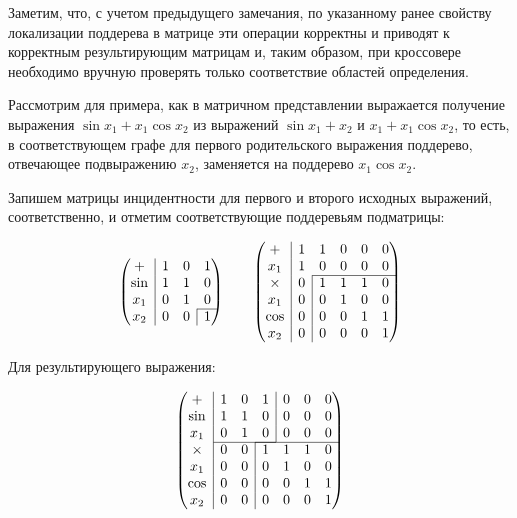 \documentclass[12pt,a4paper]{amsart}
\begin{document}
Заметим, что, с учетом предыдущего замечания, по указанному ранее свойству локализации поддерева в матрице эти
операции корректны и приводят к корректным результирующим матрицам и, таким образом, при кроссовере необходимо
вручную проверять только соответствие областей определения.

Рассмотрим для примера, как в матричном представлении выражается получение выражения $ \sin x_1 + x_1 \cos x_2 $ из
выражений $ \sin x_1 + x_2 $ и $ x_1 + x_1 \cos x_2 $, то есть, в соответствующем графе для первого родительского
выражения поддерево, отвечающее подвыражению $ x_2 $, заменяется на поддерево $ x_1 \cos x_2 $.

Запишем матрицы инцидентности для первого и второго исходных выражений, соответственно, и отметим соответствующие
поддеревьям подматрицы:

$$
\begin{pmatrix}
  +			& \multicolumn{1}{|c}{1} & 0 & 1 \\
  \sin		& \multicolumn{1}{|c}{1} & 1 & 0 \\
  x_1		& \multicolumn{1}{|c}{0} & 1 & 0 \\ \cline{4-4}
  x_2		& \multicolumn{1}{|c}{0} & 0 &\multicolumn{1}{|c}{1}
\end{pmatrix}
\qquad
\begin{pmatrix}
  +			& \multicolumn{1}{|c}{1} &						1 & 0 & 0 & 0 \\
  x_1		& \multicolumn{1}{|c}{1} &						0 & 0 & 0 & 0 \\ \cline{3-6}
  \times	& \multicolumn{1}{|c}{0} & \multicolumn{1}{|c}{1} & 1 & 1 & 0 \\
  x_1		& \multicolumn{1}{|c}{0} & \multicolumn{1}{|c}{0} & 1 & 0 & 0 \\
  \cos		& \multicolumn{1}{|c}{0} & \multicolumn{1}{|c}{0} & 0 & 1 & 1 \\
  x_2		& \multicolumn{1}{|c}{0} & \multicolumn{1}{|c}{0} & 0 & 0 & 1
\end{pmatrix}
$$

Для результирующего выражения:

$$
\begin{pmatrix}
  +			& \multicolumn{1}{|c}{1} & 0 & \multicolumn{1}{c|}{1} & 0 & 0 & 0 \\
  \sin		& \multicolumn{1}{|c}{1} & 1 & \multicolumn{1}{c|}{0} & 0 & 0 & 0 \\
  x_1		& \multicolumn{1}{|c}{0} & 1 & \multicolumn{1}{c|}{0} & 0 & 0 & 0 \\ \cline{2-4} \cline{4-7}
  \times	& \multicolumn{1}{|c}{0} & 0 & \multicolumn{1}{|c}{1} & 1 & 1 & 0 \\
  x_1		& \multicolumn{1}{|c}{0} & 0 & \multicolumn{1}{|c}{0} & 1 & 0 & 0 \\
  \cos		& \multicolumn{1}{|c}{0} & 0 & \multicolumn{1}{|c}{0} & 0 & 1 & 1 \\
  x_2		& \multicolumn{1}{|c}{0} & 0 & \multicolumn{1}{|c}{0} & 0 & 0 & 1
\end{pmatrix}
$$
\end{document}
